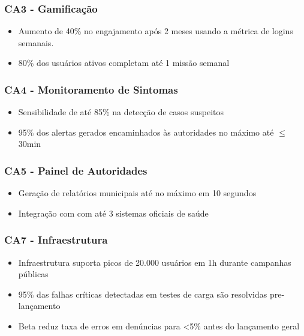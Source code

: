 \documentclass[a5paper, 12pt]{article}
\begin{document}
        \subsubsection{CA3 - Gamificação}
            \begin{itemize}
                \item Aumento de 40\% no engajamento após 2 meses usando a métrica de logins semanais.
                \item 80\% dos usuários ativos completam até 1 missão semanal
            \end{itemize}
            
        \subsubsection{CA4 - Monitoramento de Sintomas}
            \begin{itemize}
                \item Sensibilidade de até 85\% na detecção de casos suspeitos
                \item 95\% dos alertas gerados encaminhados às autoridades no máximo até $\leq$30min
            \end{itemize}
            
        \subsubsection{CA5 - Painel de Autoridades}
            \begin{itemize}
                \item Geração de relatórios municipais até no máximo em 10 segundos
                \item Integração com com até 3 sistemas oficiais de saúde
            \end{itemize}
        \subsubsection{CA7 - Infraestrutura}
            \begin{itemize}
                \item Infraestrutura suporta picos de 20.000 usuários em 1h durante campanhas públicas
                \item 95\% das falhas críticas detectadas em testes de carga são resolvidas pre-lançamento
                \item Beta reduz taxa de erros em denúncias para <5\% antes do lançamento geral
            \end{itemize}
\end{document}
